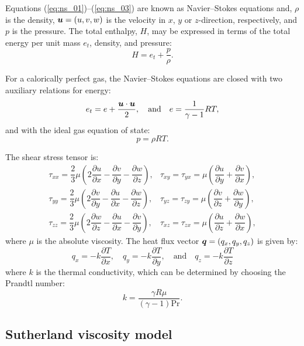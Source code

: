 \documentclass[10pt]{article}
\newcommand{\diff}[2] {\dfrac{\partial #1}{\partial #2}}
\newcommand{\bv}[1]{\ensuremath{\mbox{\boldmath$ #1 $}}}
\begin{document}
Equations (\ref{eq:ns_01})--(\ref{eq:ns_03}) are known as Navier--Stokes equations and, $\rho$ is the density, $\bv{u}=(u,v,w)$ is the velocity in $x$, $y$ or $z$-direction, respectively,    and $p$ is the pressure. The total enthalpy, $H$, may be expressed in terms of the total energy per unit mass $e_t$, density, and pressure:
$$H = e_t + \dfrac{p}{\rho}.$$ 

For a calorically perfect gas, the Navier--Stokes equations are closed with two auxiliary relations for energy:
\begin{equation}
 \label{eq:ns_04}
e_t= e+\dfrac{\bv{u}\cdot \bv{u}}{2},\quad\mbox{and}\quad e=\dfrac{1}{\gamma -1}RT ,
\end{equation}
and with the ideal gas equation of state:
\begin{equation}
 \label{eq:ns_05}
p=\rho RT.
\end{equation}

The shear stress tensor is:
\begin{equation*}
 \begin{array}{lll}
  \tau_{xx}= \dfrac{2}{3}  \mu \left( 2 \diff{u}{x} - \diff{v}{y} -\diff{w}{z} \right),
  &\tau_{xy}= \tau_{yx}=\mu \left( \diff{u}{y} + \diff{v}{x}\right),\\
  \tau_{yy}= \dfrac{2}{3}  \mu \left( 2 \diff{v}{y} - \diff{u}{x} -\diff{w}{z} \right),
  &\tau_{yz}= \tau_{zy}=\mu \left( \diff{v}{z} + \diff{w}{y}\right),\\
  \tau_{zz}= \dfrac{2}{3}  \mu \left( 2 \diff{w}{z} - \diff{u}{x} -\diff{v}{y} \right),
  &\tau_{xz}= \tau_{zx}=\mu \left( \diff{u}{z} + \diff{w}{x}\right),
 \end{array}
\end{equation*}
where $\mu$ is the absolute viscosity. The heat flux vector $\bv{q}=(q_x,q_y,q_z)$ is given by:
\begin{equation*}
 q_x = - k \diff{T}{x}, \quad q_y = - k \diff{T}{y}, \quad \mbox{and} \quad q_z = - k \diff{T}{z}
 \end{equation*}
where $k$ is the thermal conductivity, which can be determined by choosing the Prandtl number:
$$k= \dfrac{\gamma R \mu}{ (\gamma-1) \text{Pr}}.$$



\subsection{Sutherland viscosity model}
\end{document}
